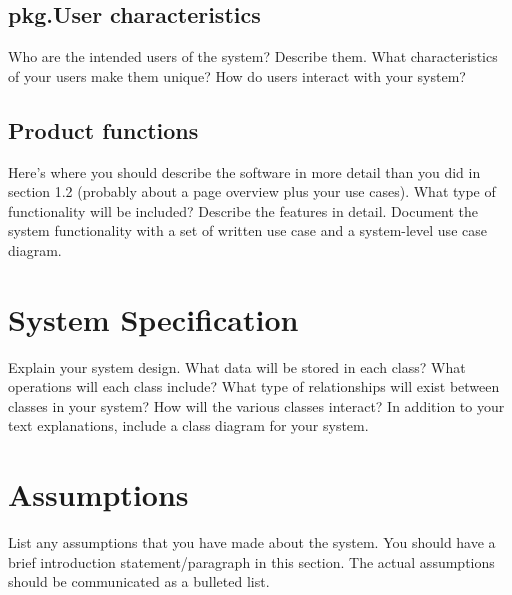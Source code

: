 \documentclass{report}
\begin{document}
\subsection{pkg.User characteristics}
Who are the intended users of the system? Describe them. What characteristics of your users make them unique?  How do users interact with your system?\par
\subsection{Product functions}
Here’s where you should describe the software in more detail than you did in section 1.2 (probably about a page overview plus your use cases). What type of functionality will be included? Describe the features in detail. Document the system functionality with a set of written use case and a system-level use case diagram.\par
\section{System Specification}
Explain your system design. What data will be stored in each class?  What operations will each class include?  What type of relationships will exist between classes in your system? How will the various classes interact? In addition to your text explanations, include a class diagram for your system.\par
\section{Assumptions}
List any assumptions that you have made about the system. You should have a brief introduction statement/paragraph in this section. The actual assumptions should be communicated as a bulleted list.\par


%



\end{document}
